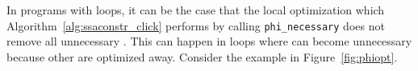 In programs with loops, it can be the case that the local optimization which Algorithm~\ref{alg:ssaconstr_click} performs by calling \verb|phi_necessary| does not remove all unnecessary \phifuns. 
This can happen in loops where \phifuns can become unnecessary because other \phifuns are optimized away. 
Consider the example in Figure~\ref{fig:phiopt}.
\begin{figure}[htbp]
	\begin{center}
		\qquad
\end{center}
\end{figure}
